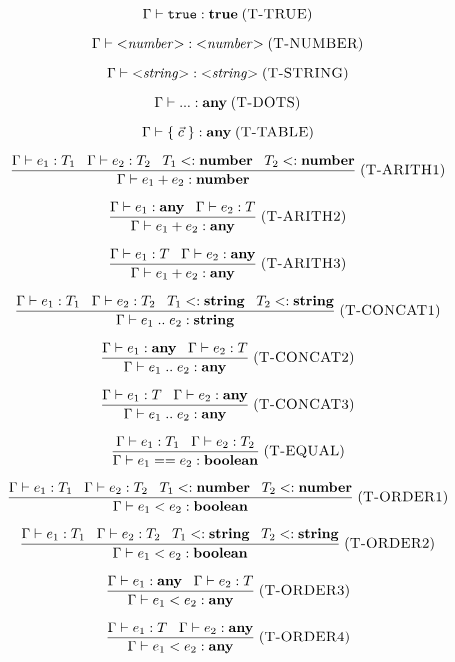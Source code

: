 \documentclass[12pt]{article}
\newcommand{\Any}{\mathbf{any}}
\newcommand{\True}{\mathbf{true}}
\newcommand{\Boolean}{\mathbf{boolean}}
\newcommand{\Number}{\mathbf{number}}
\newcommand{\String}{\mathbf{string}}
\newcommand{\kw}[1]{\mathbf{\texttt{#1}}}
\newcommand{\mylabel}[1]{\; (\textsc{#1})}
\newcommand{\subtype}{<:}
\newcommand{\env}{\Gamma}
\begin{document}
\[
\env \vdash \kw{true} : \True
\mylabel{T-TRUE}
\]

\[
\env \vdash {<}{\it number}{>} : {<}{\it number}{>}
\mylabel{T-NUMBER}
\]

\[
\env \vdash {<}{\it string}{>} : {<}{\it string}{>}
\mylabel{T-STRING}
\]

\[
\env \vdash {...} : \Any
\mylabel{T-DOTS}
\]

\[
\env \vdash \{ \; \vec{c} \; \} : \Any
\mylabel{T-TABLE}
\]

\[
\frac{\env \vdash e_{1}:T_{1} \;\;\;
      \env \vdash e_{2}:T_{2} \;\;\;
      T_{1} \subtype \Number \;\;\;
      T_{2} \subtype \Number}
     {\env \vdash e_{1} + e_{2} : \Number}
\mylabel{T-ARITH1}
\]

\[
\frac{\env \vdash e_{1}:\Any \;\;\;
      \env \vdash e_{2}:T}
     {\env \vdash e_{1} + e_{2} : \Any}
\mylabel{T-ARITH2}
\]

\[
\frac{\env \vdash e_{1}:T \;\;\;
      \env \vdash e_{2}:\Any}
     {\env \vdash e_{1} + e_{2} : \Any}
\mylabel{T-ARITH3}
\]

\[
\frac{\env \vdash e_{1}:T_{1} \;\;\;
      \env \vdash e_{2}:T_{2} \;\;\;
      T_{1} \subtype \String \;\;\;
      T_{2} \subtype \String}
     {\env \vdash e_{1} \; {..} \; e_{2} : \String}
\mylabel{T-CONCAT1}
\]

\[
\frac{\env \vdash e_{1}:\Any \;\;\;
      \env \vdash e_{2}:T}
     {\env \vdash e_{1} \; {..} \; e_{2} : \Any}
\mylabel{T-CONCAT2}
\]

\[
\frac{\env \vdash e_{1}:T \;\;\;
      \env \vdash e_{2}:\Any}
     {\env \vdash e_{1} \; {..} \; e_{2} : \Any}
\mylabel{T-CONCAT3}
\]

\[
\frac{\env \vdash e_{1}:T_{1} \;\;\;
      \env \vdash e_{2}:T_{2}}
     {\env \vdash e_{1} == e_{2} : \Boolean}
\mylabel{T-EQUAL}
\]

\[
\frac{\env \vdash e_{1}:T_{1} \;\;\;
      \env \vdash e_{2}:T_{2} \;\;\;
      T_{1} \subtype \Number \;\;\;
      T_{2} \subtype \Number}
     {\env \vdash e_{1} < e_{2} : \Boolean}
\mylabel{T-ORDER1}
\]

\[
\frac{\env \vdash e_{1}:T_{1} \;\;\;
      \env \vdash e_{2}:T_{2} \;\;\;
      T_{1} \subtype \String \;\;\;
      T_{2} \subtype \String}
     {\env \vdash e_{1} < e_{2} : \Boolean}
\mylabel{T-ORDER2}
\]

\[
\frac{\env \vdash e_{1}:\Any \;\;\;
      \env \vdash e_{2}:T}
     {\env \vdash e_{1} < e_{2} : \Any}
\mylabel{T-ORDER3}
\]

\[
\frac{\env \vdash e_{1}:T \;\;\;
      \env \vdash e_{2}:\Any}
     {\env \vdash e_{1} < e_{2} : \Any}
\mylabel{T-ORDER4}
\]
\end{document}
